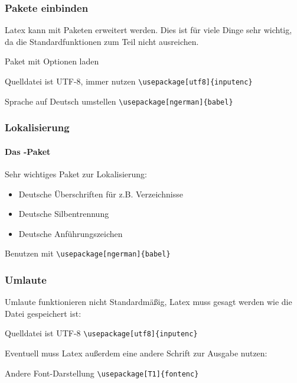 \begin{frame}[fragile]
    \frametitle{Pakete einbinden}
    
    Latex kann mit Paketen erweitert werden. Dies ist für viele Dinge sehr wichtig, da die Standardfunktionen zum Teil nicht ausreichen.
    \begin{block}{Paket mit Optionen laden}
    \end{block}
    \pause
    \bigskip
    \begin{exampleblock}{Quelldatei ist UTF-8, immer nutzen}
		\verb+\usepackage[utf8]{inputenc}+
    \end{exampleblock}
    \pause
    \begin{exampleblock}{Sprache auf Deutsch umstellen}
        \verb+\usepackage[ngerman]{babel}+
    \end{exampleblock}
\end{frame}


\begin{frame}[fragile]
    \frametitle{Lokalisierung}
    \framesubtitle{Das -Paket}
    
    Sehr wichtiges Paket zur Lokalisierung:
    \begin{itemize}
        \item Deutsche Überschriften für z.B. Verzeichnisse
        \item Deutsche Silbentrennung
        \item Deutsche Anführungszeichen
    \end{itemize}
    \bigskip
    \begin{block}{Benutzen mit}
        \verb+\usepackage[ngerman]{babel}+
    \end{block}
\end{frame}


\begin{frame}[fragile]
    \frametitle{Umlaute}
    
    Umlaute funktionieren nicht Standardmäßig, Latex muss gesagt werden wie die Datei gespeichert ist:
    \begin{block}{Quelldatei ist UTF-8}
		\verb+\usepackage[utf8]{inputenc}+
    \end{block}
    \pause
    
    Eventuell muss Latex außerdem eine andere Schrift zur Ausgabe nutzen:
    \begin{block}{Andere Font-Darstellung}
		\verb+\usepackage[T1]{fontenc}+
    \end{block}
\end{frame}


